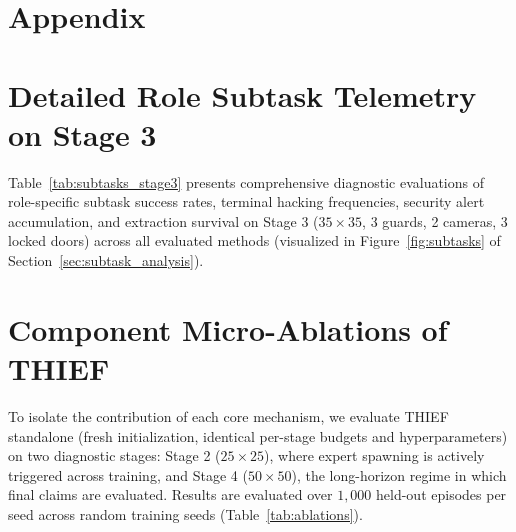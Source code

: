 \appendix
\section*{Appendix}
\label{sec:appendix}

\section{Detailed Role Subtask Telemetry on Stage 3}
\label{sec:app_subtasks}

Table~\ref{tab:subtasks_stage3} presents comprehensive diagnostic evaluations of role-specific subtask success rates, terminal hacking frequencies, security alert accumulation, and extraction survival on Stage 3 ($35 \times 35$, 3 guards, 2 cameras, 3 locked doors) across all evaluated methods (visualized in Figure~\ref{fig:subtasks} of Section~\ref{sec:subtask_analysis}).



\section{Component Micro-Ablations of THIEF}
\label{sec:app_ablation}
To isolate the contribution of each core mechanism, we evaluate THIEF standalone (fresh initialization, identical per-stage budgets and hyperparameters) on two diagnostic stages: Stage 2 ($25 \times 25$), where expert spawning is actively triggered across training, and Stage 4 ($50 \times 50$), the long-horizon regime in which final claims are evaluated. Results are evaluated over $1,\!000$ held-out episodes per seed across random training seeds (Table~\ref{tab:ablations}).


